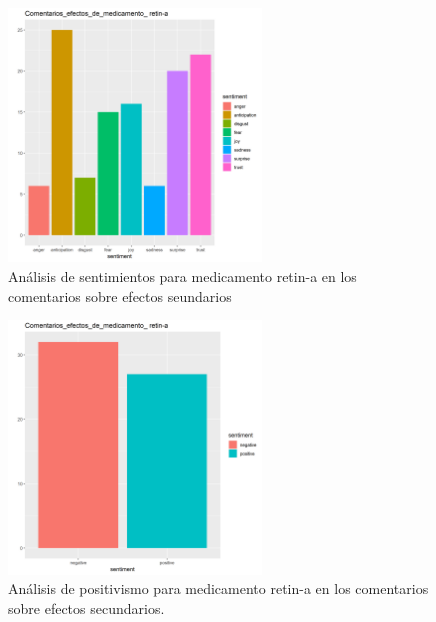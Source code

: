 \documentclass[spanish,]{article}
\begin{document}
\begin{figure}[h]
    \centering
    \includegraphics[width=0.6\textwidth]{figuras/sentimientos/Bretin1.png}
    \caption{Análisis de sentimientos para medicamento retin-a en los comentarios sobre efectos seundarios}
    \label{fig:sentimientos:42}
\end{figure}

\begin{figure}[h]
    \centering
    \includegraphics[width=0.6\textwidth]{figuras/sentimientos/Bretin2.png}
    \caption{Análisis de positivismo para medicamento retin-a en los comentarios sobre efectos secundarios.}
    \label{fig:sentimientos:43}
\end{figure}
\end{document}
